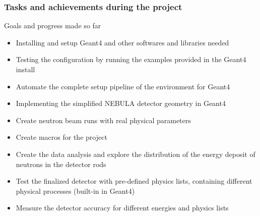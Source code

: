 \begin{frame}
\frametitle{Tasks and achievements during the project}

\begin{block}{Goals and progress made so far}
	\begin{itemize}
		\item[{\color{PineGreen} \checkmark}] Installing and setup Geant4 and other softwares and libraries needed
		\item[{\color{PineGreen} \checkmark}] Testing the configuration by running the examples provided in the Geant4 install
		\item[{\color{PineGreen} \checkmark}] Automate the complete setup pipeline of the environment for Geant4
		\item[{\color{PineGreen} \checkmark}] Implementing the simplified NEBULA detector geometry in Geant4
		\item[{\color{PineGreen} \checkmark}] Create neutron beam runs with real physical parameters
		\item[{\color{PineGreen} \checkmark}] Create macros for the project
		\item[{\color{PineGreen} \checkmark}] Create the data analysis and explore the distribution of the energy deposit of neutrons in the detector rods
		\item[{\color{PineGreen} \checkmark}] Test the finalized detector with pre-defined physics lists, containing different physical processes (built-in in Geant4)
		\item[{\color{PineGreen} \checkmark}] Measure the detector accuracy for different energies and physics lists
	\end{itemize}
\end{block}

\end{frame}